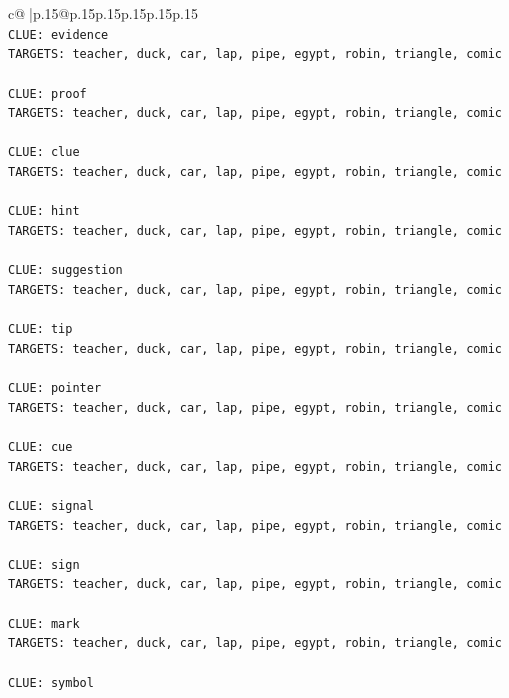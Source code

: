 \documentclass{article}
\begin{document}
{\begin{supertabular}{c@{$\;$}|p{.15\linewidth}@{}p{.15\linewidth}p{.15\linewidth}p{.15\linewidth}p{.15\linewidth}p{.15\linewidth}}
{{{\\ 
\texttt{CLUE: evidence} \\
\texttt{TARGETS: teacher, duck, car, lap, pipe, egypt, robin, triangle, comic} \\
\\ 
\texttt{CLUE: proof} \\
\texttt{TARGETS: teacher, duck, car, lap, pipe, egypt, robin, triangle, comic} \\
\\ 
\texttt{CLUE: clue} \\
\texttt{TARGETS: teacher, duck, car, lap, pipe, egypt, robin, triangle, comic} \\
\\ 
\texttt{CLUE: hint} \\
\texttt{TARGETS: teacher, duck, car, lap, pipe, egypt, robin, triangle, comic} \\
\\ 
\texttt{CLUE: suggestion} \\
\texttt{TARGETS: teacher, duck, car, lap, pipe, egypt, robin, triangle, comic} \\
\\ 
\texttt{CLUE: tip} \\
\texttt{TARGETS: teacher, duck, car, lap, pipe, egypt, robin, triangle, comic} \\
\\ 
\texttt{CLUE: pointer} \\
\texttt{TARGETS: teacher, duck, car, lap, pipe, egypt, robin, triangle, comic} \\
\\ 
\texttt{CLUE: cue} \\
\texttt{TARGETS: teacher, duck, car, lap, pipe, egypt, robin, triangle, comic} \\
\\ 
\texttt{CLUE: signal} \\
\texttt{TARGETS: teacher, duck, car, lap, pipe, egypt, robin, triangle, comic} \\
\\ 
\texttt{CLUE: sign} \\
\texttt{TARGETS: teacher, duck, car, lap, pipe, egypt, robin, triangle, comic} \\
\\ 
\texttt{CLUE: mark} \\
\texttt{TARGETS: teacher, duck, car, lap, pipe, egypt, robin, triangle, comic} \\
\\ 
\texttt{CLUE: symbol} \\
}}}
\end{supertabular}}
\end{document}
